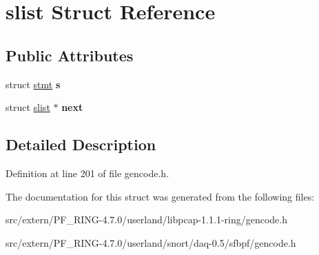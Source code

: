 \hypertarget{structslist}{
\section{slist Struct Reference}
\label{structslist}
}
\subsection*{Public Attributes}
\begin{DoxyCompactItemize}
\item 
\hypertarget{structslist_a305a3584f855177d0d4f591a9a669abf}{
struct \hyperlink{structstmt}{stmt} {\bfseries s}}
\label{structslist_a305a3584f855177d0d4f591a9a669abf}

\item 
\hypertarget{structslist_a71c7d4a8bd55ca01d37e275fb50b45d7}{
struct \hyperlink{structslist}{slist} $\ast$ {\bfseries next}}
\label{structslist_a71c7d4a8bd55ca01d37e275fb50b45d7}

\end{DoxyCompactItemize}


\subsection{Detailed Description}


Definition at line 201 of file gencode.h.



The documentation for this struct was generated from the following files:\begin{DoxyCompactItemize}
\item 
src/extern/PF\_\-RING-\/4.7.0/userland/libpcap-\/1.1.1-\/ring/gencode.h\item 
src/extern/PF\_\-RING-\/4.7.0/userland/snort/daq-\/0.5/sfbpf/gencode.h\end{DoxyCompactItemize}
